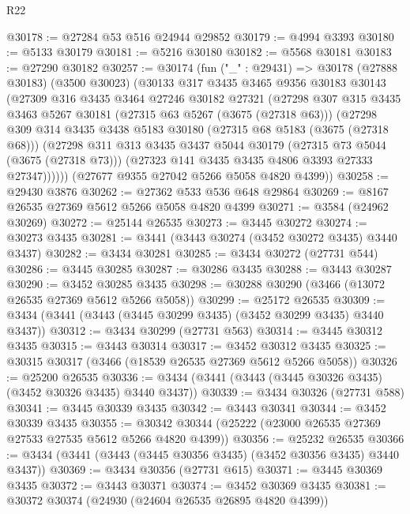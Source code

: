 \begin{lexlean}{R22}
\begin{coremodule}
@30178 := @27284 @53 @516 @24944 @29852
@30179 := @4994 @3393
@30180 := @5133 @30179
@30181 := @5216 @30180
@30182 := @5568 @30181
@30183 := @27290 @30182
@30257 := @30174
    (fun ("_" : @29431) =>
    @30178
      (@27888 @30183)
      (@3500 @30023)
      (@30133
        @317
        @3435
        @3465
        @9356
        @30183
        @30143
        (@27309
          @316
          @3435
          @3464
          @27246
          @30182
          @27321
          (@27298
            @307
            @315
            @3435
            @3463
            @5267
            @30181
            (@27315 @63 @5267 (@3675 (@27318 @63)))
            (@27298
              @309
              @314
              @3435
              @3438
              @5183
              @30180
              (@27315 @68 @5183 (@3675 (@27318 @68)))
              (@27298
                @311
                @313
                @3435
                @3437
                @5044
                @30179
                (@27315 @73 @5044 (@3675 (@27318 @73)))
                (@27323 @141 @3435 @3435 @4806 @3393 @27333 @27347))))))
      (@27677 @9355 @27042 @5266 @5058 @4820 @4399))
@30258 := @29430 @3876
@30262 := @27362 @533 @536 @648 @29864
@30269 := @8167 @26535 @27369 @5612 @5266 @5058 @4820 @4399
@30271 := @3584 (@24962 @30269)
@30272 := @25144 @26535
@30273 := @3445 @30272
@30274 := @30273 @3435
@30281 := @3441 (@3443 @30274 (@3452 @30272 @3435) @3440 @3437)
@30282 := @3434 @30281
@30285 := @3434 @30272 (@27731 @544)
@30286 := @3445 @30285
@30287 := @30286 @3435
@30288 := @3443 @30287
@30290 := @3452 @30285 @3435
@30298 := @30288 @30290 (@3466 (@13072 @26535 @27369 @5612 @5266 @5058))
@30299 := @25172 @26535
@30309 := @3434 (@3441 (@3443 (@3445 @30299 @3435) (@3452 @30299 @3435) @3440 @3437))
@30312 := @3434 @30299 (@27731 @563)
@30314 := @3445 @30312 @3435
@30315 := @3443 @30314
@30317 := @3452 @30312 @3435
@30325 := @30315 @30317 (@3466 (@18539 @26535 @27369 @5612 @5266 @5058))
@30326 := @25200 @26535
@30336 := @3434 (@3441 (@3443 (@3445 @30326 @3435) (@3452 @30326 @3435) @3440 @3437))
@30339 := @3434 @30326 (@27731 @588)
@30341 := @3445 @30339 @3435
@30342 := @3443 @30341
@30344 := @3452 @30339 @3435
@30355 := @30342 @30344 (@25222 (@23000 @26535 @27369 @27533 @27535 @5612 @5266 @4820 @4399))
@30356 := @25232 @26535
@30366 := @3434 (@3441 (@3443 (@3445 @30356 @3435) (@3452 @30356 @3435) @3440 @3437))
@30369 := @3434 @30356 (@27731 @615)
@30371 := @3445 @30369 @3435
@30372 := @3443 @30371
@30374 := @3452 @30369 @3435
@30381 := @30372 @30374 (@24930 (@24604 @26535 @26895 @4820 @4399))

\end{coremodule}
\end{lexlean}
